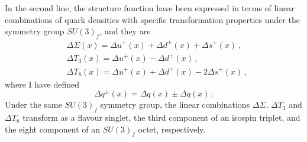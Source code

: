 In the second line, the structure function have been expressed in terms of linear combinations of quark densities with specific transformation properties under the symmetry group $SU(3)_{f}$, and they are
\begin{align}
  & \Delta \Sigma (x) = \Delta u^{+} (x) + \Delta d^{+} (x) +\Delta s^{+} (x) \,, \\
  & \Delta T_3 (x) = \Delta u^{+} (x) - \Delta d^{+} (x) \,, \\
  & \Delta T_8 (x) = \Delta u^{+} (x) + \Delta d^{+} (x) - 2 \Delta s^{+} (x) \,,
\end{align}
where I have defined\\
\begin{equation}
 \Delta q^{\pm}(x) = \Delta q(x) \pm \Delta \bar{q}(x) \,.
\end{equation}
Under the same $SU(3)_f$ symmetry group, the linear combinations $\Delta \Sigma, \,\Delta T_3$ and $\Delta T_8$ transform as a flavour singlet, the third component of an isospin triplet, and the eight component of an $SU(3)_f$ octet, respectively.

